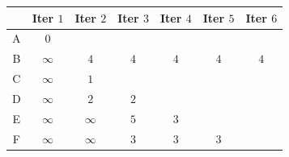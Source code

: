 \documentclass{article}
\begin{document}
\begin{center}
 \begin{tabular}{| c || c | c | c | c | c | c |} 
 \hline
 \, & Iter $1$ & Iter $2$ & Iter $3$ & Iter $4$ & Iter $5$ & Iter $6$ \\ [0.5ex] 
 \hline\hline
A & $0$ & \, & \, & \, & \, & \, \\ 
 \hline
B & $\infty$ & $4$ & $4$ & $4$ & $4$ & $4$ \\
 \hline
C & $\infty$ & $1$ & \, & \, & \, & \, \\
 \hline
D & $\infty$ & $2$ & $2$ & \, & \, & \, \\
 \hline
E & $\infty$ & $\infty$ & $5$ & $3$ & \, & \, \\
 \hline
F & $\infty$ & $\infty$ & $3$ & $3$ & $3$ & \, \\
 \hline
\end{tabular}
\end{center}
\end{document}
